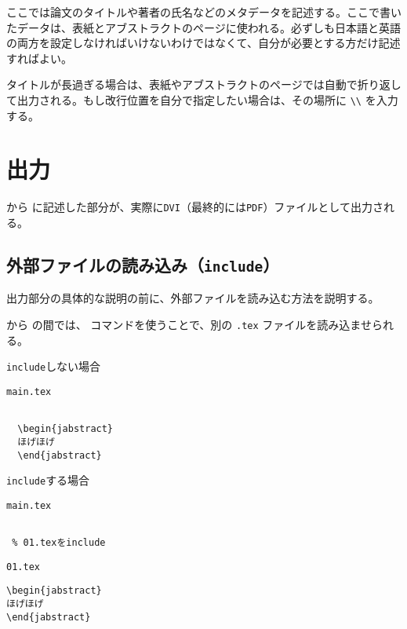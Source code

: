ここでは論文のタイトルや著者の氏名などのメタデータを記述する。ここで書いたデータは、表紙とアブストラクトのページに使われる。必ずしも日本語と英語の両方を設定しなければいけないわけではなくて、自分が必要とする方だけ記述すればよい。

タイトルが長過ぎる場合は、表紙やアブストラクトのページでは自動で折り返して出力される。もし改行位置を自分で指定したい場合は、その場所に \verb|\\| を入力する。


\section{出力}

\verb|| から \verb|| に記述した部分が、実際に{\tt DVI}（最終的には{\tt PDF}）ファイルとして出力される。

\subsection{外部ファイルの読み込み（{\tt include}）}

出力部分の具体的な説明の前に、外部ファイルを読み込む方法を説明する。

\verb|| から \verb|| の間では、\verb|| コマンドを使うことで、別の {\tt *.tex} ファイルを読み込ませられる。 

\begin{itembox}[l]{{\tt include}しない場合}
\begin{itembox}[l]{{\tt main.tex}}
\begin{verbatim}

  \begin{jabstract}
  ほげほげ
  \end{jabstract}

\end{verbatim}
\end{itembox}
\end{itembox}

\begin{itembox}[l]{{\tt include}する場合}
\begin{minipage}{0.5\hsize}
\begin{itembox}[l]{{\tt main.tex}}
\begin{verbatim}

 % 01.texをinclude

\end{verbatim}
\end{itembox}
\end{minipage}
\begin{minipage}{0.5\hsize}
\begin{itembox}[l]{{\tt 01.tex}}
\begin{verbatim}
\begin{jabstract}
ほげほげ
\end{jabstract}
\end{verbatim}
\end{itembox}
\end{minipage}
\end{itembox}

